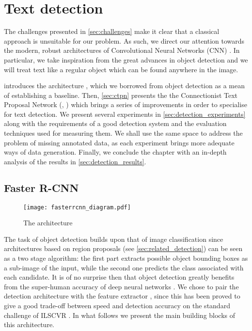 
\chapter{Text detection}
\label{ch:detection}

The challenges presented in \autoref{sec:challenges} make it clear that a classical approach is unsuitable for our problem. As such, we direct our attention towards the modern, robust architectures of Convolutional Neural Networks (CNN) \citep{leCun_CNN}. In particular, we take inspiration from the great advances in object detection and we will treat text like a regular object which can be found anywhere in the image.

 introduces the \FRCNN{} architecture \citep{faster_rcnn}, which we borrowed from object detection as a mean of establishing a baseline. Then, \autoref{sec:ctpn} presents the the Connectionist Text Proposal Network (\CTPN{}, \citet{ctpn}) which brings a series of improvements in order to specialise for text detection. We present several experiments in \autoref{sec:detection_experiments} along with the requirements of a good detection system and the evaluation techniques used for measuring them. We shall use the same space to address the problem of missing annotated data, as each experiment brings more adequate ways of data generation. Finally, we conclude the chapter with an in-depth analysis of the results in \autoref{sec:detection_results}.


\section{Faster R-CNN}\label{sec:faster_rcnn}

	\begin{figure}
		\texttt{[image: fasterrcnn\_diagram.pdf]}
		\caption[The \FRCNN{} architecture]{The \FRCNN{} architecture \citep[credit to][]{detection_benchmark}
		\label{fig:faster_rcnn}
		}
	\end{figure}

	The task of object detection builds upon that of image classification since architectures based on region proposals (see \autoref{sec:related_detection}) can be seen as a two stage algorithm: the first part extracts possible object bounding boxes as a sub-image of the input, while the second one predicts the class associated with each candidate. It is of no surprise then that object detection greatly benefits from the super-human accuracy of deep neural networks \citep{superhuman_classif}. We chose to pair the \FRCNN{} detection architecture with the \RESNET{} feature extractor \citep{resnet}, since this has been proved to give a good trade-off between speed and detection accuracy on the standard challenge of ILSCVR \citep{detection_benchmark}. In what follows we present the main building blocks of this architecture.

